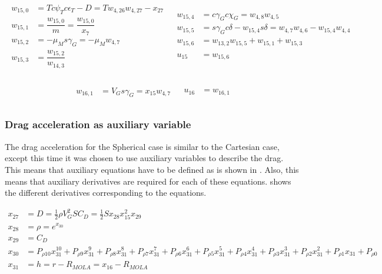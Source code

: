 \begin{align} \label{eq:auxF15}
\begin{split}
w_{15,0} &= T c\psi_{T} c\epsilon_{T}-D = Tw_{4,26}w_{4,27}-x_{27} \\
w_{15,1} &= \dfrac{w_{15,0}}{m} = \dfrac{w_{15,0}}{x_{7}} \\
w_{15,2} &= -\mu_{M} s\gamma_{G} = -\mu_{M}w_{4,7} \\
w_{15,3} &= \dfrac{w_{15,2}}{w_{14,3}} \\
\end{split}
&
\begin{split}
w_{15,4} &= c\gamma_{G}c\chi_{G} = w_{4,8}w_{4,5} \\
w_{15,5} &= s\gamma_{G} c\delta - w_{15,4} s\delta = w_{4,7}w_{4,6}-w_{15,4}w_{4,4} \\
w_{15,6} &= w_{13,2}w_{15,5}+w_{15,1}+w_{15,3} \\
\\
u_{15} &= w_{15,6} \\
\end{split}
\end{align}

\begin{align} \label{eq:auxF16}
\begin{split}
w_{16,1} &= V_{G} s\gamma_{G} = x_{15}w_{4,7} \\
\end{split}
&
\begin{split}
u_{16} &= w_{16,1} \\
\end{split}
\end{align}




 
 \subsubsection{Drag acceleration as auxiliary variable}
 \label{subsubsec:tsiDragAuxE}
The drag acceleration for the Spherical case is similar to the Cartesian case, except this time it was chosen to use auxiliary variables to describe the drag. This means that auxiliary equations have to be defined as is shown in . Also, this means that auxiliary derivatives are required for each of these equations.  shows the different derivatives corresponding to the equations.
 
 \begin{equation} \label{eq:dragAux}
\begin{split}
x_{27} &= D = \frac{1}{2}\rho V_{G}^{2}SC_{D} = \frac{1}{2}Sx_{28}x_{15}^{2}x_{29}\\
x_{28} &= \rho = e^{x_{30}} \\
x_{29} &= C_{D} \\
x_{30} &= P_{\rho 10}x_{31}^{10}+P_{\rho 9}x_{31}^{9}+P_{\rho 8}x_{31}^{8}+P_{\rho 7}x_{31}^{7}+P_{\rho 6}x_{31}^{6}+P_{\rho 5}x_{31}^{5}+P_{\rho 4}x_{31}^{4}+P_{\rho 3}x_{31}^{3}+P_{\rho 2}x_{31}^{2}+P_{\rho 1}x_{31}+P_{\rho 0} \\
x_{31} &= h = r-R_{MOLA} = x_{16}-R_{MOLA} \\
\end{split}
\end{equation}

